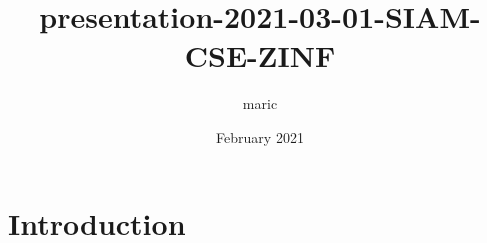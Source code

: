 \documentclass{article}
\title{presentation-2021-03-01-SIAM-CSE-ZINF}
\author{maric }
\date{February 2021}
\begin{document}
\maketitle

\section{Introduction}
\end{document}
